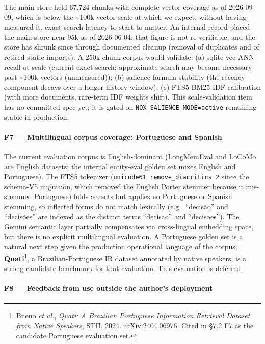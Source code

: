 \documentclass[
]{article}
\begin{document}
The main store held 67,724 chunks with complete vector coverage as of
2026-09-09, which is below the \textasciitilde100k-vector scale at which
we expect, without having measured it, exact-search latency to start to
matter. An internal record placed the main store near 95k as of
2026-06-04; that figure is not re-verifiable, and the store has shrunk
since through documented cleanup (removal of duplicates and of retired
static imports). A 250k chunk corpus would validate: (a) sqlite-vec ANN
recall at scale (current exact-search; approximate search may become
necessary past \textasciitilde100k vectors (unmeasured)); (b) salience
formula stability (the recency component decays over a longer history
window); (c) FTS5 BM25 IDF calibration (with more documents, rare-term
IDF weights shift). This scale-validation item has no committed spec
yet; it is gated on \texttt{NOX\_SALIENCE\_MODE=active} remaining stable
in production.

\paragraph{F7 --- Multilingual corpus coverage: Portuguese and
Spanish}\label{f7-multilingual-corpus-coverage-portuguese-and-spanish}

The current evaluation corpus is English-dominant (LongMemEval and
LoCoMo are English datasets; the internal entity-eval golden set mixes
English and Portuguese). The FTS5 tokenizer
(\texttt{unicode61\ remove\_diacritics\ 2} since the schema-V5
migration, which removed the English Porter stemmer because it
mis-stemmed Portuguese) folds accents but applies no Portuguese or
Spanish stemming, so inflected forms do not match lexically (e.g.,
``decisão'' and ``decisões'' are indexed as the distinct terms
``decisao'' and ``decisoes''). The Gemini semantic layer partially
compensates via cross-lingual embedding space, but there is no explicit
multilingual evaluation. A Portuguese golden set is a natural next step
given the production operational language of the corpus;
\textbf{Quati}\footnote{Bueno \emph{et al.}, \emph{Quati: A Brazilian
  Portuguese Information Retrieval Dataset from Native Speakers}, STIL
  2024. arXiv:2404.06976. Cited in §7.2 F7 as the candidate Portuguese
  evaluation set.}, a Brazilian-Portuguese IR dataset annotated by
native speakers, is a strong candidate benchmark for that evaluation.
This evaluation is deferred.

\paragraph{F8 --- Feedback from use outside the author's
deployment}\label{f8-feedback-from-use-outside-the-authors-deployment}
\end{document}
